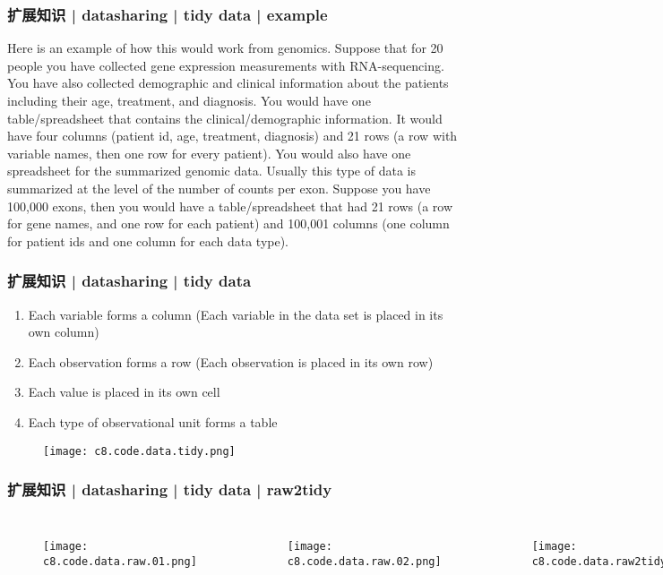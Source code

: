 \begin{frame}
  \frametitle{扩展知识 | datasharing | tidy data | example}
  Here is an example of how this would work from genomics. Suppose that for 20 people you have collected gene expression measurements with RNA-sequencing. You have also collected demographic and clinical information about the patients including their age, treatment, and diagnosis. You would have one table/spreadsheet that contains the clinical/demographic information. It would have four columns (patient id, age, treatment, diagnosis) and 21 rows (a row with variable names, then one row for every patient). You would also have one spreadsheet for the summarized genomic data. Usually this type of data is summarized at the level of the number of counts per exon. Suppose you have 100,000 exons, then you would have a table/spreadsheet that had 21 rows (a row for gene names, and one row for each patient) and 100,001 columns (one column for patient ids and one column for each data type). 
\end{frame}

\begin{frame}
  \frametitle{扩展知识 | datasharing | tidy data}
  \begin{enumerate}
    \item Each variable forms a column (Each variable in the data set is placed in its own column)
    \item Each observation forms a row (Each observation is placed in its own row)
    \item Each value is placed in its own cell
    \item Each type of observational unit forms a table
  \end{enumerate}
  \begin{figure}
    \centering
    \texttt{[image: c8.code.data.tidy.png]}
  \end{figure}
\end{frame}

\begin{frame}
  \frametitle{扩展知识 | datasharing | tidy data | raw2tidy}
  \begin{columns}
  \begin{figure}
    \centering
    \texttt{[image: c8.code.data.raw.01.png]}
  \end{figure}
  \begin{figure}
    \centering
    \texttt{[image: c8.code.data.raw.02.png]}
  \end{figure}
  \begin{figure}
    \centering
    \texttt{[image: c8.code.data.raw2tidy.png]}
  \end{figure}
\end{columns}
\end{frame}

